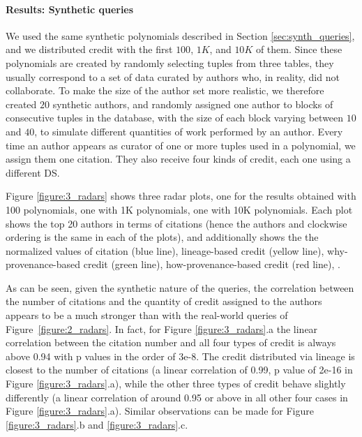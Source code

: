 \paragraph{Results: Synthetic queries}
We used the same synthetic polynomials described in Section \ref{sec:synth_queries}, and we distributed credit with the first $100$, $1K$, and $10K$ of them.
Since these polynomials are created by randomly selecting tuples from three tables, they usually correspond to a set of data curated by  authors who, in reality, did not collaborate. To make the size of the author set more realistic, we therefore created $20$ synthetic authors, and randomly assigned one author to blocks of consecutive tuples in the database, with the size of each block varying between $10$ and $40$, to simulate different quantities of work performed by an author. 
Every time an author appears as curator of one or more tuples used in a polynomial, we assign them one citation.  
They also receive four kinds of credit, each one using a different DS.

Figure \ref{figure:3_radars} shows three radar plots, one for the results obtained with 100 polynomials, one with 1K polynomials, one with 10K polynomials.  
Each plot shows the top 20 authors in terms of citations (hence the authors and clockwise ordering is the same in each of the plots), and additionally shows the the normalized values of citation (blue line), lineage-based credit (yellow line), why-provenance-based credit (green line), how-provenance-based  credit (red line), . 

As can be seen, given the synthetic nature of the queries, the correlation between the number of citations and the quantity of credit assigned to the authors appears to be a much stronger than with the real-world queries of Figure~\ref{figure:2_radars}. In fact, for Figure \ref{figure:3_radars}.a  the linear correlation between the citation number and all four types of credit is always above 0.94 with p values in the order of 3e-8.
The credit distributed via lineage is closest to  the number of citations (a linear correlation of 0.99, p value of 2e-16 in Figure \ref{figure:3_radars}.a), while the other three types of credit behave slightly differently (a linear correlation of around 0.95 or above in all other four cases in Figure \ref{figure:3_radars}.a).  
Similar observations can be made for Figure \ref{figure:3_radars}.b and \ref{figure:3_radars}.c.

